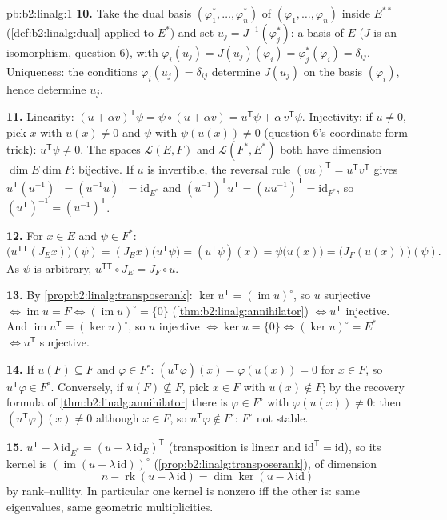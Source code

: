 \begin{solution}{pb:b2:linalg:1}
\textbf{10.} Take the dual basis $(\varphi_1^*, \dots,
\varphi_n^*)$ of $(\varphi_1, \dots, \varphi_n)$ inside $E^{**}$
(\cref{def:b2:linalg:dual} applied to $E^*$) and set $u_j =
J^{-1}(\varphi_j^*)$: a basis of $E$ ($J$ is an isomorphism,
question 6), with $\varphi_i(u_j) = J(u_j)(\varphi_i) =
\varphi_j^*(\varphi_i) = \delta_{ij}$. Uniqueness: the conditions
$\varphi_i(u_j) = \delta_{ij}$ determine $J(u_j)$ on the basis
$(\varphi_i)$, hence determine $u_j$.

\textbf{11.} Linearity: $(u + \alpha v)^{\mathsf T}\psi = \psi
\circ (u + \alpha v) = u^{\mathsf T}\psi + \alpha\, v^{\mathsf
T}\psi$. Injectivity: if $u \neq 0$, pick $x$ with $u(x) \neq 0$
and $\psi$ with $\psi(u(x)) \neq 0$ (question 6's coordinate-form
trick): $u^{\mathsf T}\psi \neq 0$. The spaces $\mathcal{L}(E,F)$
and $\mathcal{L}(F^*, E^*)$ both have dimension $\dim E \dim F$:
bijective. If $u$ is invertible, the reversal rule $(vu)^{\mathsf
T} = u^{\mathsf T}v^{\mathsf T}$ gives $u^{\mathsf
T}(u^{-1})^{\mathsf T} = (u^{-1}u)^{\mathsf T} =
\mathrm{id}_{E^*}$ and $(u^{-1})^{\mathsf T}u^{\mathsf T} =
(uu^{-1})^{\mathsf T} = \mathrm{id}_{F^*}$, so $(u^{\mathsf
T})^{-1} = (u^{-1})^{\mathsf T}$.

\textbf{12.} For $x \in E$ and $\psi \in F^*$:
\[
\bigl(u^{\mathsf T\mathsf T}(J_E x)\bigr)(\psi)
= (J_E x)\bigl(u^{\mathsf T}\psi\bigr)
= (u^{\mathsf T}\psi)(x)
= \psi\bigl(u(x)\bigr)
= \bigl(J_F(u(x))\bigr)(\psi).
\]
As $\psi$ is arbitrary, $u^{\mathsf T\mathsf T} \circ J_E = J_F
\circ u$.

\textbf{13.} By \cref{prop:b2:linalg:transposerank}: $\ker
u^{\mathsf T} = (\operatorname{im} u)^\circ$, so $u$ surjective
$\iff \operatorname{im} u = F \iff (\operatorname{im}u)^\circ =
\{0\}$ (\cref{thm:b2:linalg:annihilator}) $\iff u^{\mathsf T}$
injective. And $\operatorname{im} u^{\mathsf T} = (\ker
u)^\circ$, so $u$ injective $\iff \ker u = \{0\} \iff (\ker
u)^\circ = E^*$ $\iff u^{\mathsf T}$ surjective.

\textbf{14.} If $u(F) \subseteq F$ and $\varphi \in F^\circ$:
$(u^{\mathsf T}\varphi)(x) = \varphi(u(x)) = 0$ for $x \in F$, so
$u^{\mathsf T}\varphi \in F^\circ$. Conversely, if $u(F)
\not\subseteq F$, pick $x \in F$ with $u(x) \notin F$; by the
recovery formula of \cref{thm:b2:linalg:annihilator} there is
$\varphi \in F^\circ$ with $\varphi(u(x)) \neq 0$: then
$(u^{\mathsf T}\varphi)(x) \neq 0$ although $x \in F$, so
$u^{\mathsf T}\varphi \notin F^\circ$: $F^\circ$ not stable.

\textbf{15.} $u^{\mathsf T} - \lambda\,\mathrm{id}_{E^*} = (u -
\lambda\,\mathrm{id}_E)^{\mathsf T}$ (transposition is linear and
$\mathrm{id}^{\mathsf T} = \mathrm{id}$), so its kernel is
$(\operatorname{im}(u - \lambda\,\mathrm{id}))^\circ$
(\cref{prop:b2:linalg:transposerank}), of dimension
\[
n - \operatorname{rk}(u - \lambda\,\mathrm{id})
= \dim\ker(u - \lambda\,\mathrm{id})
\]
by rank--nullity. In particular one kernel is nonzero iff the
other is: same eigenvalues, same geometric multiplicities.


\end{solution}
